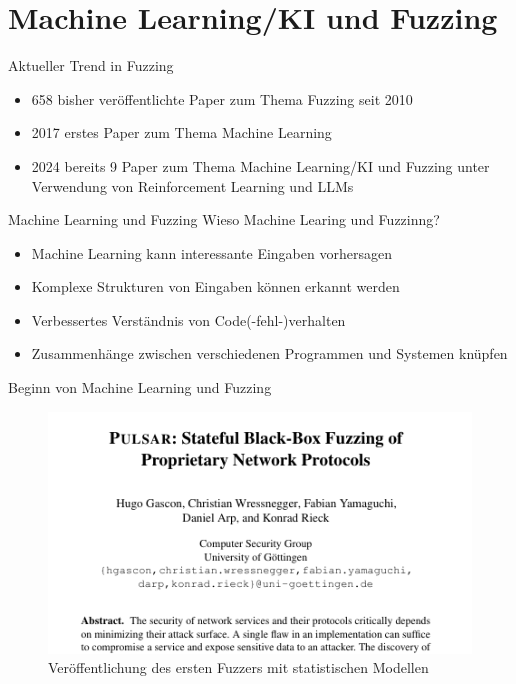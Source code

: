 
\section{Machine Learning/KI und Fuzzing}\label{sec:machine-learning-und-fuzzing}
\begin{frame}{Aktueller Trend in Fuzzing}
    \begin{itemize}
        \item 658 bisher veröffentlichte Paper zum Thema Fuzzing seit 2010~\cite{fuzzing-paper}
        \item 2017 erstes Paper zum Thema Machine Learning~\cite{godefroid2017learnfuzzmachinelearninginput}
        \item 2024 bereits 9 Paper zum Thema Machine Learning/KI und Fuzzing unter Verwendung von Reinforcement Learning und LLMs~\cite{fuzzing-paper}
    \end{itemize}
\end{frame}
\begin{frame}{Machine Learning und Fuzzing}
    Wieso Machine Learing und Fuzzinng?
    \begin{itemize}
        \item Machine Learning kann interessante Eingaben vorhersagen
        \item Komplexe Strukturen von Eingaben können erkannt werden
        \item Verbessertes Verständnis von Code(-fehl-)verhalten
        \item Zusammenhänge zwischen verschiedenen Programmen und Systemen knüpfen
    \end{itemize}
\end{frame}
\begin{frame}{Beginn von Machine Learning und Fuzzing}
    \begin{figure}[H]
        \centering
        \includegraphics[width=\textwidth]{res/pulsar}
        \caption[Pioniere des Fuzzing mit Machine Learning]{
            Veröffentlichung des ersten Fuzzers mit statistischen Modellen~\cite{thuraisingham_pulsar_2015}
        }
        \label{fig:ml_fuzzing}
    \end{figure}
\end{frame}
